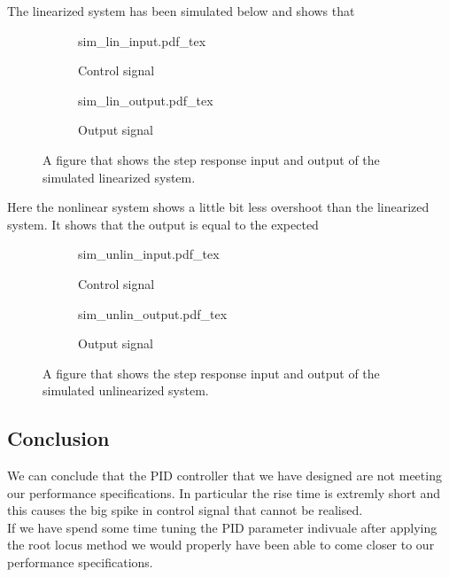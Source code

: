 \documentclass[12pt]{article}
\begin{document}
The linearized system has been simulated below and shows that

\begin{figure}[H]
\centering
\begin{subfigure}{0.5\textwidth}
  \def\svgwidth{\textwidth}
  {sim_lin_input.pdf_tex}
  \label{}
  \centering
  \caption{Control signal} \label{my_input_step_li}
\end{subfigure}%
\begin{subfigure}{0.5\textwidth}
  \centering
  \def\svgwidth{\textwidth}
  {sim_lin_output.pdf_tex}
  \caption{Output signal} \label{my_output_step_li}
\end{subfigure}
\caption{A figure that shows the step response input and output of the simulated linearized system.}
\label{fig:step_li}
\end{figure}

Here the nonlinear system shows a little bit less overshoot than the linearized system. It shows that the output is equal to the expected


\begin{figure}[H]
\centering
\begin{subfigure}{0.5\textwidth}
  \def\svgwidth{\textwidth}
  {sim_unlin_input.pdf_tex}
  \label{}
  \centering
  \caption{Control signal} \label{my_input_step_li}
\end{subfigure}%
\begin{subfigure}{0.5\textwidth}
  \centering
  \def\svgwidth{\textwidth}
  {sim_unlin_output.pdf_tex}
  \caption{Output signal} \label{my_output_step_li}
\end{subfigure}
\caption{A figure that shows the step response input and output of the simulated unlinearized system.}
\label{fig:step_li}
\end{figure}

\subsection*{Conclusion}
We can conclude that the PID controller that we have designed are not meeting our performance specifications. In particular the rise time is extremly short and this causes the big spike in control signal that cannot be realised.\\
If we have spend some time tuning the PID parameter indivuale after applying the root locus method we would properly have been able to come closer to our performance specifications.
\end{document}
